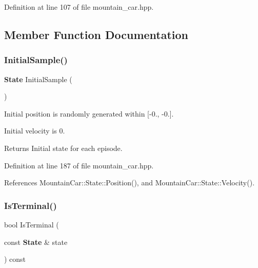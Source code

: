Definition at line 107 of file mountain\+\_\+car.\+hpp.



\subsection{Member Function Documentation}
\mbox{\label{classmlpack_1_1rl_1_1MountainCar_aa9f537249fa0c1e62b38197996ab4c6a}} 
\subsubsection{Initial\+Sample()}
{\footnotesize\ttfamily \textbf{ State} Initial\+Sample (\begin{DoxyParamCaption}{ }\end{DoxyParamCaption})\hspace{0.3cm}{\ttfamily [inline]}}



Initial position is randomly generated within [-\/0., -\/0.]. 

Initial velocity is 0.

\begin{DoxyReturn}{Returns}
Initial state for each episode. 
\end{DoxyReturn}


Definition at line 187 of file mountain\+\_\+car.\+hpp.



References Mountain\+Car\+::\+State\+::\+Position(), and Mountain\+Car\+::\+State\+::\+Velocity().

\mbox{\label{classmlpack_1_1rl_1_1MountainCar_a7fd056133dfd315e4bf45c408f99326f}} 
\subsubsection{Is\+Terminal()}
{\footnotesize\ttfamily bool Is\+Terminal (\begin{DoxyParamCaption}\item[{const \textbf{ State} \&}]{state }\end{DoxyParamCaption}) const\hspace{0.3cm}{\ttfamily [inline]}}



